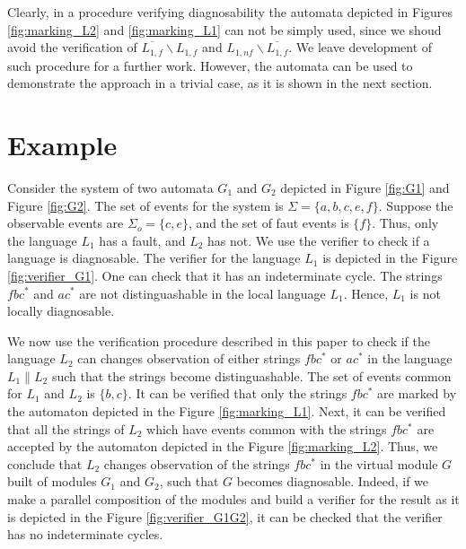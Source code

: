 \documentclass[a4paper, 10pt, conference]{ieeeconf}
\begin{document}
Clearly, in a procedure verifying diagnosability the automata depicted in
Figures \ref{fig:marking_L2} and \ref{fig:marking_L1} can not be simply used,
since we shoud avoid the verification of $\overline{L_{1,f}} \backslash L_{1,f}$
and $L_{1,nf} \backslash \overline{L_{1,f}}$. We leave development of such
procedure for a further work. However, the automata can be used to demonstrate
the approach in a trivial case, as it is shown in the next section.

\section{Example}
\label{sec:Example}

Consider the system of two automata $G_1$ and $G_2$ depicted in Figure
\ref{fig:G1} and Figure \ref{fig:G2}. The set of events for the system is
$\Sigma = \{a, b, c, e, f\}$. Suppose the observable events are $\Sigma_o = \{c,
e\}$, and the set of faut events is $\{f\}$. Thus, only the language $L_1$ has a
fault, and $L_2$ has not. We use the verifier \cite{yoo_polynomial-time_2002} to
check if a language is diagnosable. The verifier for the language $L_1$ is
depicted in the Figure \ref{fig:verifier_G1}. One can check that it has an
indeterminate cycle.
The strings $fbc^*$ and $ac^*$ are not distinguashable in the local language
$L_1$. Hence, $L_1$ is not locally diagnosable.

We now use the verification procedure described in this paper to check if the
language $L_2$ can changes observation of either strings $fbc^*$ or
$ac^*$ in the language $L_1 \parallel L_2$ such that the strings become
distinguashable. The set of events common for $L_1$ and $L_2$ is $\{b, c\}$. It
can be verified that only the strings $fbc^*$ are marked by the automaton
depicted in the Figure \ref{fig:marking_L1}. Next, it can be verified that all
the strings of $L_2$ which have events common with the strings $fbc^*$ are
accepted by the automaton depicted in the Figure \ref{fig:marking_L2}. Thus, we
conclude that $L_2$ changes observation of the strings $fbc^*$ in the virtual
module $G$ built of modules $G_1$ and $G_2$, such that $G$ becomes diagnosable.
Indeed, if we make a parallel composition of the modules and build a verifier
for the result as it is depicted in the Figure \ref{fig:verifier_G1G2}, it can
be checked that the verifier has no indeterminate cycles.
\end{document}
